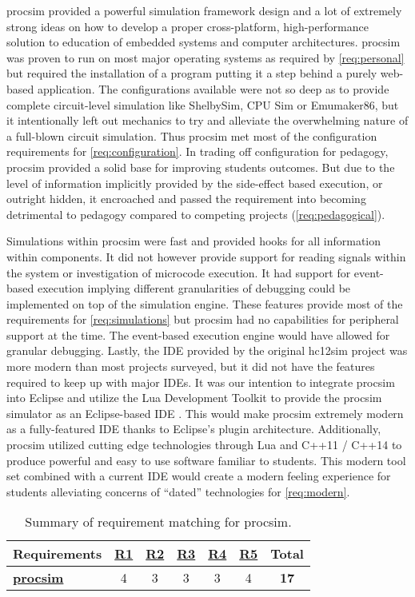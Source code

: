 procsim provided a powerful simulation framework design and a lot of extremely strong ideas on how to develop a proper cross-platform, high-performance solution to education of embedded systems and computer architectures. procsim  was proven to run on most major operating systems as required by \cref{req:personal} but required the installation of a program putting it a step behind a purely web-based application. The configurations available were not so deep as to provide complete circuit-level simulation like ShelbySim, CPU Sim or Emumaker86, but it intentionally left out mechanics to try and alleviate the overwhelming nature of a full-blown circuit simulation. Thus procsim met most of the configuration requirements for \cref{req:configuration}. In trading off configuration for pedagogy, procsim provided a solid base for improving students outcomes. But due to the level of information implicitly provided by the side-effect based execution, or outright hidden, it encroached and passed the requirement into becoming detrimental to pedagogy compared to competing projects (\cref{req:pedagogical}). 

Simulations within procsim were fast and provided hooks for all information within components. It did not however provide support for reading signals within the system or investigation of microcode execution. It had support for event-based execution implying different granularities of debugging could be implemented on top of the simulation engine. These features provide most of the requirements for \cref{req:simulations} but procsim had no capabilities for peripheral support at the time. The event-based execution engine would have allowed for granular debugging. Lastly, the IDE provided by the original hc12sim project was more modern than most projects surveyed, but it did not have the features required to keep up with major IDEs. It was our intention to integrate procsim into Eclipse and utilize the Lua Development Toolkit to provide the procsim simulator as an Eclipse-based IDE \cite{Eclipse:LDT}. This would make procsim extremely modern as a fully-featured IDE thanks to Eclipse's plugin architecture. Additionally, procsim utilized cutting edge technologies through Lua and C++11 / C++14 to produce powerful and easy to use software familiar to students. This modern tool set combined with a current IDE would create a modern feeling experience for students alleviating concerns of ``dated'' technologies for \cref{req:modern}.

\begin{table}[h!]
    \centering
    \begin{tabular}{l|cccccc}
        \textbf{Requirements} & \textbf{\hyperref[req:personal]{R1}} & \textbf{\hyperref[req:configuration]{R2}} & \textbf{\hyperref[req:pedagogical]{R3}} & \textbf{\hyperref[req:simulations]{R4}} & \textbf{\hyperref[req:modern]{R5}} & \textbf{Total} \\ \hline
        \textbf{\hyperref[ch:lua]{procsim}} & 
        4 & 3 & 3 & 3 & 4 & \textbf{17} \\
    \end{tabular}
    \caption{Summary of requirement matching for procsim.}
\end{table}